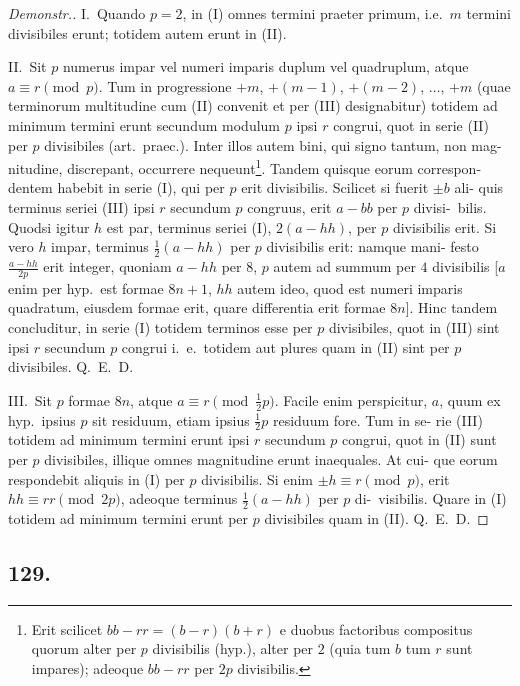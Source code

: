 \documentclass[12pt,a4paper]{article}
\theoremstyle{plain}
\theoremstyle{definition}
\theoremstyle{remark}
\begin{document}
\begin{proof}[Demonstr.]
I.\ Quando $p = 2$, in (I) omnes termini praeter primum, i.e.\ $m$ termini divisibiles erunt; totidem autem erunt in (II).

II.\ Sit $p$ numerus impar vel numeri imparis duplum vel quadruplum, atque
$a \equiv r \pmod{p}$. Tum in progressione $+m$, $+(m-1)$, $+(m-2)$, $\ldots$, $+m$
(quae terminorum multitudine cum (II) convenit et per (III) designabitur) totidem
ad minimum termini erunt secundum modulum $p$ ipsi $r$ congrui, quot in serie (II)
per $p$ divisibiles (art.\ praec.). Inter illos autem bini, qui signo tantum, non mag-
nitudine, discrepant, occurrere nequeunt\footnote{Erit scilicet $bb - rr = (b-r)(b+r)$ e duobus factoribus compositus quorum alter per $p$ divisibilis (hyp.), alter per $2$ (quia tum $b$ tum $r$ sunt impares); adeoque $bb - rr$ per $2p$ divisibilis.}. Tandem quisque eorum correspon-
dentem habebit in serie (I), qui per $p$ erit divisibilis. Scilicet si fuerit $\pm b$ ali-
quis terminus seriei (III) ipsi $r$ secundum $p$ congruus, erit $a - bb$ per $p$ divisi-\ bilis. Quodsi igitur $h$ est par, terminus seriei (I), $2(a-hh)$, per $p$ divisibilis
erit. Si vero $h$ impar, terminus $\frac{1}{2}(a-hh)$ per $p$ divisibilis erit: namque mani-
festo $\frac{a-hh}{2p}$ erit integer, quoniam $a-hh$ per $8$, $p$ autem ad summum per
$4$ divisibilis [$a$ enim per hyp.\ est formae $8n+1$, $hh$ autem ideo, quod est numeri
imparis quadratum, eiusdem formae erit, quare differentia erit formae $8n$]. Hinc
tandem concluditur, in serie (I) totidem terminos esse per $p$ divisibiles, quot in
(III) sint ipsi $r$ secundum $p$ congrui i.~e.\ totidem aut plures quam in (II) sint
per $p$ divisibiles. Q.~E.~D.

III.\ Sit $p$ formae $8n$, atque $a \equiv r \pmod{\frac{1}{2}p}$. Facile enim perspicitur, $a$,
quum ex hyp.\ ipsius $p$ sit residuum, etiam ipsius $\frac{1}{2}p$ residuum fore. Tum in se-
rie (III) totidem ad minimum termini erunt ipsi $r$ secundum $p$ congrui, quot in
(II) sunt per $p$ divisibiles, illique omnes magnitudine erunt inaequales. At cui-
que eorum respondebit aliquis in (I) per $p$ divisibilis. Si enim $\pm h \equiv r \pmod{p}$, erit $hh \equiv rr \pmod{2p}$, adeoque terminus $\frac{1}{2}(a-hh)$ per $p$ di-\ visibilis. Quare in (I) totidem ad minimum termini erunt per $p$ divisibiles
quam in (II). Q.~E.~D.
\end{proof}

\subsection*{129.}
\end{document}
